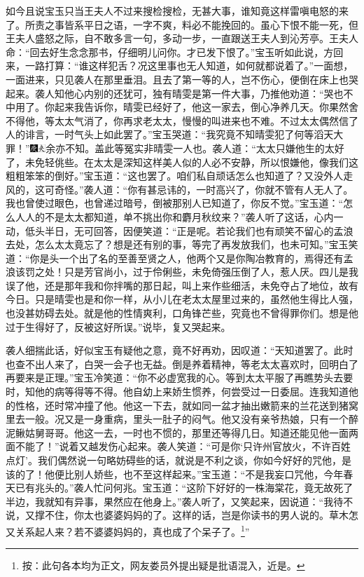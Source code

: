 如今且说宝玉只当王夫人不过来搜检搜检，无甚大事，谁知竟这样雷嗔电怒的来了。所责之事皆系平日之语，一字不爽，料必不能挽回的。虽心下恨不能一死，但王夫人盛怒之际，自不敢多言一句，多动一步，一直跟送王夫人到沁芳亭。王夫人命：“回去好生念念那书，仔细明儿问你。才已发下恨了。”宝玉听如此说，方回来，一路打算：“谁这样犯舌？况这里事也无人知道，如何就都说着了。”一面想，一面进来，只见袭人在那里垂泪。且去了第一等的人，岂不伤心，便倒在床上也哭起来。袭人知他心内别的还犹可，独有晴雯是第一件大事，乃推他劝道：“哭也不中用了。你起来我告诉你，晴雯已经好了，他这一家去，倒心净养几天。你果然舍不得他，等太太气消了，你再求老太太，慢慢的叫进来也不难。不过太太偶然信了人的诽言，一时气头上如此罢了。”宝玉哭道：“我究竟不知晴雯犯了何等滔天大罪！”{\includegraphics[width=3mm]{../Images/00004}\includegraphics[width=3mm]{../Images/00012}\footnotesize \kaishu 余亦不知。盖此等冤实非晴雯一人也。}袭人道：“太太只嫌他生的太好了，未免轻佻些。在太太是深知这样美人似的人必不安静，所以恨嫌他，像我们这粗粗笨笨的倒好。”宝玉道：“这也罢了。咱们私自顽话怎么也知道了？又没外人走风的，这可奇怪。”袭人道：“你有甚忌讳的，一时高兴了，你就不管有人无人了。我也曾使过眼色，也曾递过暗号，倒被那别人已知道了，你反不觉。”宝玉道：“怎么人人的不是太太都知道，单不挑出你和麝月秋纹来？”袭人听了这话，心内一动，低头半日，无可回答，因便笑道：“正是呢。若论我们也有顽笑不留心的孟浪去处，怎么太太竟忘了？想是还有别的事，等完了再发放我们，也未可知。”宝玉笑道：“你是头一个出了名的至善至贤之人，他两个又是你陶冶教育的，焉得还有孟浪该罚之处！只是芳官尚小，过于伶俐些，未免倚强压倒了人，惹人厌。四儿是我误了他，还是那年我和你拌嘴的那日起，叫上来作些细活，未免夺占了地位，故有今日。只是晴雯也是和你一样，从小儿在老太太屋里过来的，虽然他生得比人强，也没甚妨碍去处。就是他的性情爽利，口角锋芒些，究竟也不曾得罪你们。想是他过于生得好了，反被这好所误。”说毕，复又哭起来。

袭人细揣此话，好似宝玉有疑他之意，竟不好再劝，因叹道：“天知道罢了。此时也查不出人来了，白哭一会子也无益。倒是养着精神，等老太太喜欢时，回明白了再要来是正理。”宝玉冷笑道：“你不必虚宽我的心。等到太太平服了再瞧势头去要时，知他的病等得等不得。他自幼上来娇生惯养，何尝受过一日委屈。连我知道他的性格，还时常冲撞了他。他这一下去，就如同一盆才抽出嫩箭来的兰花送到猪窝里去一般。况又是一身重病，里头一肚子的闷气。他又没有亲爷热娘，只有一个醉泥鳅姑舅哥哥。他这一去，一时也不惯的，那里还等得几日。知道还能见他一面两面不能了！”说着又越发伤心起来。袭人笑道：“可是你‘只许州官放火，不许百姓点灯’。我们偶然说一句略妨碍些的话，就说是不利之谈，你如今好好的咒他，是该的了！他便比别人娇些，也不至这样起来。”宝玉道：“不是我妄口咒他，今年春天已有兆头的。”袭人忙问何兆。宝玉道：“这阶下好好的一株海棠花，竟无故死了半边，我就知有异事，果然应在他身上。”袭人听了，又笑起来，因说道：“我待不说，又撑不住，你太也婆婆妈妈的了。这样的话，岂是你读书的男人说的。草木怎又关系起人来？{若不婆婆妈妈的，真也成了个呆子了。}\footnote{按：此句各本均为正文，网友娄员外提出疑是批语混入，近是。}”

